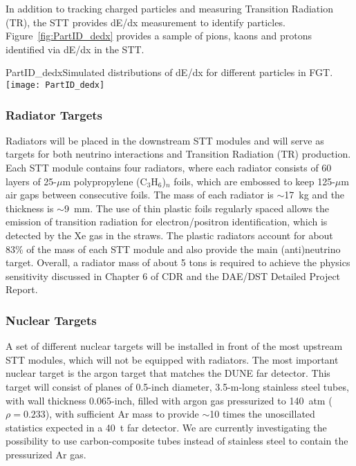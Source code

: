 In addition to tracking charged particles and measuring Transition Radiation (TR), 
the STT provides dE/dx measurement to identify particles. 
Figure~\ref{fig:PartID_dedx} provides a sample of pions, kaons and protons identified via dE/dx in the STT.
\begin{cdrfigure}
{PartID_dedx}{Simulated distributions of dE/dx for different particles in FGT.}
\texttt{[image: PartID\_dedx]}
\end{cdrfigure}

\subsubsection{Radiator Targets} 


Radiators will be placed in the downstream STT modules and will serve
as targets for both neutrino interactions and Transition Radiation
(TR) production. Each STT module contains four radiators, where each
radiator consists of 60 layers of 25-$\mu$m polypropylene
(C$_3$H$_6$)$_n$ foils, which are embossed to keep 125-$\mu$m air gaps
between consecutive foils.  The mass of each radiator is $\sim$17~kg
and the thickness is $\sim$9~mm. The use of thin plastic foils
regularly spaced allows the emission of transition radiation for
electron/positron identification, which is detected by the Xe gas in
the straws. The plastic radiators account for about 83\% of the mass of each STT module and 
also provide the main (anti)neutrino target. Overall, a radiator mass of about 5 tons 
is required to achieve the physics sensitivity discussed in 
Chapter 6 of CDR \volphys %
and the DAE/DST Detailed Project Report\cite{DPR}. 

\subsubsection{Nuclear Targets} 

A set of different nuclear targets will be installed in front of the
most upstream STT modules, which will not be equipped with radiators.
The most important nuclear target is the argon target that matches
the DUNE far detector.  This target will consist of planes of 0.5-inch
diameter, 3.5-m-long stainless steel tubes, with wall thickness 0.065-inch,
filled with argon gas pressurized to 140~atm ($\rho = 0.233$), with
sufficient Ar mass to provide $\sim$10 times the unoscillated
statistics expected in a 40~t far detector.  We are currently investigating the
possibility to use carbon-composite tubes instead of stainless steel to contain 
the pressurized Ar gas.

